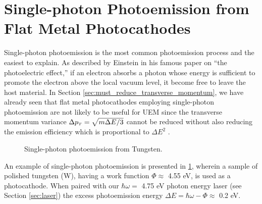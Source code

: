\section{Single-photon Photoemission from Flat Metal Photocathodes}

Single-photon photoemission is the most common photoemission process and the easiest to explain.
As described by Einstein in his famous paper on ``the photoelectric effect,'' if an electron absorbs a photon whose energy is sufficient to promote the electron above the local vacuum level, it become free to leave the host material.
In Section \ref{sec:must_reduce_transverse_momentum}, we have already seen that flat metal photocathodes employing single-photon photoemission are not likely to be useful for UEM since the transverse momentum variance $\Delta p_{{\scriptscriptstyle T}} = \sqrt{ m \Delta E / 3 } $ \cite{dowell_quantum_2009} cannot be reduced without also reducing the emission efficiency which is proportional to $\Delta E^2$ \cite{shalaev_electron_1994}.

\begin{figure}
  \centering
  
  \caption[Single-photon photoemission from Tungsten]{
    Single-photon photoemission from Tungsten.
  }
  \label{fig:single_photon_tungsten}
\end{figure}

An example of single-photon photoemission is presented in \ref{fig:single_photon_tungsten}, wherein a sample of polished tungsten (W), having a work function $\Phi \approx $ 4.55 eV, %
is used as a photocathode.
When paired with our $\hbar \omega = $ 4.75 eV photon energy laser (see Section \ref{sec:laser}) the excess photoemission energy $\Delta E = \hbar \omega - \Phi \approx $ 0.2 eV.


